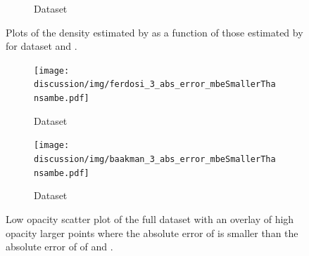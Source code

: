 \begin{figure}
\begin{subfigure}{0.23\textwidth}
			\caption{Dataset \baakmanThree}
			\label{fig:discussion:multisphere:mbevssambe:baakman3}
		\end{subfigure}	
		\caption{Plots of the density estimated by \sambe as a function of those estimated by \mbe for dataset %
			\ferdosiTwo and %
			\baakmanTwo.
		}
		\label{fig:discussion:multisphere:four:mbevssambe}
	\end{figure}

	\begin{figure}
		\centering
		\begin{subfigure}{0.23\textwidth}
			\centering
			\texttt{[image: discussion/img/ferdosi\_3\_abs\_error\_mbeSmallerThansambe.pdf]}
			\caption{Dataset \ferdosiThree}
			\label{fig:discussion:multisphere:mbeLoweError:ferdosi3}
		\end{subfigure}
		\begin{subfigure}{0.23\textwidth}
			\centering
			\texttt{[image: discussion/img/baakman\_3\_abs\_error\_mbeSmallerThansambe.pdf]}
			\caption{Dataset \baakmanThree}
			\label{fig:discussion:multisphere:mbeLoweError:baakman3}
		\end{subfigure}	
		\caption{Low opacity scatter plot of the full dataset with an overlay of high opacity larger points where the absolute error of \mbe is smaller than the absolute error of \sambe of %
			\ferdosiTwo and %
			\baakmanTwo.
		}
		\label{fig:discussion:multisphere:four:mbeLoweError}
	\end{figure}	